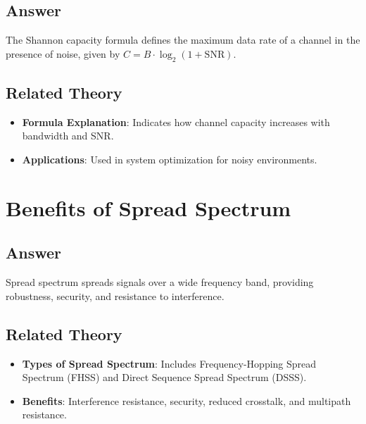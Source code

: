 \documentclass{article}
\begin{document}
\subsection{Answer}
The Shannon capacity formula defines the maximum data rate of a channel in the presence of noise, given by \( C = B \cdot \log_2(1 + \text{SNR}) \).

\subsection{Related Theory}
\begin{itemize}
    \item \textbf{Formula Explanation}: Indicates how channel capacity increases with bandwidth and SNR.
    \item \textbf{Applications}: Used in system optimization for noisy environments.
\end{itemize}

\section{Benefits of Spread Spectrum}
\subsection{Answer}
Spread spectrum spreads signals over a wide frequency band, providing robustness, security, and resistance to interference.

\subsection{Related Theory}
\begin{itemize}
    \item \textbf{Types of Spread Spectrum}: Includes Frequency-Hopping Spread Spectrum (FHSS) and Direct Sequence Spread Spectrum (DSSS).
    \item \textbf{Benefits}: Interference resistance, security, reduced crosstalk, and multipath resistance.
\end{itemize}
\end{document}
